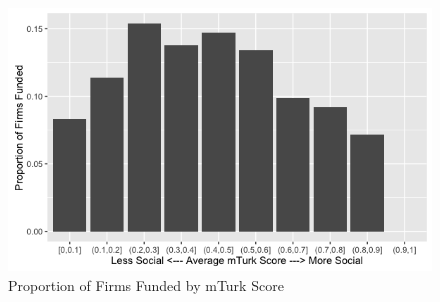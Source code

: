 \documentclass[12pt]{article}
\begin{document}
\begin{figure} [!htb]
\centering
\includegraphics[scale=0.55]{proportion_funded}
\caption{Proportion of Firms Funded by mTurk Score}
\end{figure}
\end{document}
